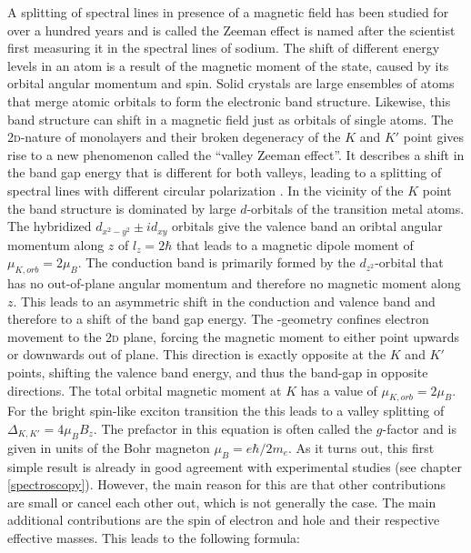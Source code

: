 A splitting of spectral lines in presence of a magnetic field has been studied for over a hundred years and is called the Zeeman effect is named after the scientist first measuring it in the spectral lines of sodium. The shift of different energy levels in an atom is a result of the magnetic moment of the state, caused by its orbital angular momentum and spin. Solid crystals are large ensembles of atoms that merge atomic orbitals to form the electronic band structure. Likewise, this band structure can shift in a magnetic field just as orbitals of single atoms. The 2\textsc{d}-nature of \tmdg monolayers and their broken degeneracy of the $K$ and $K'$ point gives rise to a new phenomenon called the ``valley Zeeman effect''. It describes a shift in the band gap energy that is different for both valleys, leading to a splitting of spectral lines with different circular polarization \cite{srivastava_valley_2015, aivazian_magnetic_2015}. In the vicinity of the $K$ point the band structure is dominated by large $d$-orbitals of the transition metal atoms. The hybridized $d_{x^2-y^2} \pm id_{xy}$ orbitals give the valence band an oribtal angular momentum along $z$ of $l_z=2\hbar$ that leads to a magnetic dipole moment of $\mu_{K,orb}=2\mu_B$. The conduction band is primarily formed by the $d_{z^2}$-orbital that has no out-of-plane angular momentum and therefore no magnetic moment along $z$. This leads to an asymmetric shift in the conduction and valence band and therefore to a shift of the band gap energy. The \tmd-geometry confines electron movement to the 2\textsc{d} plane, forcing the magnetic moment to either point upwards or downwards out of plane. This direction is exactly opposite at the $K$ and $K'$ points, shifting the valence band energy, and thus the band-gap in opposite directions. The total orbital magnetic moment at $K$ has a value of $\mu_{K,orb}=2\mu_B$. For the bright spin-like exciton transition the this leads to a valley splitting of $\Delta_{K,K'}=4\mu_BB_z$. The prefactor in this equation is often called the $g$-factor and is given in units of the Bohr magneton $\mu_B=e\hbar/2m_e$. As it turns out, this first simple result is already in good agreement with experimental studies (see chapter \ref{spectroscopy}). However, the main reason for this are that other contributions are small or cancel each other out, which is not generally the case. The main additional contributions are the spin of electron and hole and their respective effective masses. %
This leads to the following formula:

